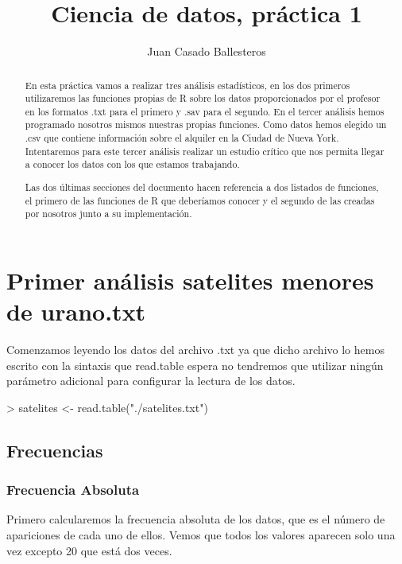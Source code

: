 \documentclass [a4paper] {article}
\title{Ciencia de datos, práctica 1}
\author{Juan Casado Ballesteros}
\begin{document}
\maketitle

\begin{abstract}
En esta práctica vamos a realizar tres análisis estadísticos, 
en los dos primeros utilizaremos las funciones propias de R sobre los datos proporcionados por el profesor en los formatos .txt para el primero y .sav para el segundo.
En el tercer análisis hemos programado nosotros mismos nuestras propias funciones. 
Como datos hemos elegido un .csv que contiene información sobre el alquiler en la Ciudad de Nueva York.
Intentaremos para este tercer análisis realizar un estudio crítico que nos permita llegar a conocer los datos con los que estamos trabajando.

Las dos últimas secciones del documento hacen referencia a dos listados de funciones, 
el primero de las funciones de R que deberíamos conocer y el segundo de las creadas por nosotros junto a su implementación.
\end{abstract}

\newpage
\tableofcontents
\newpage


\section{Primer análisis satelites menores de urano.txt}

Comenzamos leyendo los datos del archivo .txt ya que dicho archivo lo hemos escrito con la sintaxis que read.table espera 
no tendremos que utilizar ningún parámetro adicional para configurar la lectura de los datos.
\begin{Schunk}
\begin{Sinput}
> satelites <- read.table("./satelites.txt")
\end{Sinput}
\end{Schunk}

\subsection{Frecuencias}
\subsubsection{Frecuencia Absoluta}
Primero calcularemos la frecuencia absoluta de los datos, que es el número de apariciones de cada uno de ellos.
Vemos que todos los valores aparecen solo una vez excepto 20 que está dos veces.
\end{document}
